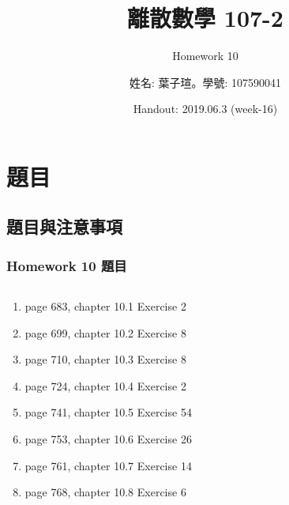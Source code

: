 \documentclass[12pt,hyperref={bookmarks=false}]{beamer}
\title{離散數學 107-2}
\subtitle{Homework 10}
\author{姓名: 葉子瑄。學號: 107590041}
\date{Handout: 2019.06.3 (week-16)}
\begin{document}

\begin{frame}
\titlepage
\end{frame}

\raggedright

\begin{frame}
\footnotesize
\tableofcontents
\end{frame}
	
\section{題目}

	\subsection{題目與注意事項}
	
	\begin{frame}
	\frametitle{Homework 10 題目}
	\fontsize{10pt}{11pt}\selectfont
	\setlength{\baselineskip}{5pt}
	\begin{columns}
	\begin{column}{0.68\textwidth}
	\begin{enumerate}[label=(Prob. \arabic*)]
	\setlength\itemsep{0em}
	\item page 683, chapter 10.1 Exercise 2
	\item page 699, chapter 10.2 Exercise 8
	\item page 710, chapter 10.3 Exercise 8
	\item page 724, chapter 10.4 Exercise 2
	\item page 741, chapter 10.5 Exercise 54
	\item page 753, chapter 10.6 Exercise 26
	\item page 761, chapter 10.7 Exercise 14
	\item page 768, chapter 10.8 Exercise 6
	\end{enumerate}
	\end{column}
	
	
	\end{columns}
	\end{frame}
	
\end{document}
